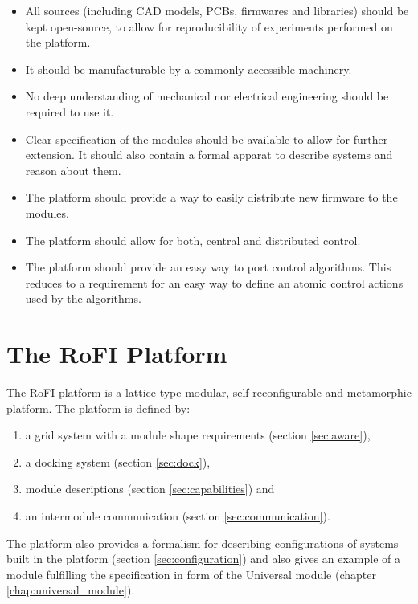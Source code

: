 \begin{itemize}
    \item All sources (including CAD models, PCBs, firmwares and libraries)
    should be kept open-source, to allow for reproducibility of experiments
    performed on the platform.
    \item It should be manufacturable by a commonly accessible machinery.
    \item No deep understanding of mechanical nor electrical engineering should
    be required to use it.
    \item Clear specification of the modules should be available to allow for
    further extension. It should also contain a formal apparat to describe
    systems and reason about them.
    \item The platform should provide a way to easily distribute new firmware to
    the modules.
    \item The platform should allow for both, central and distributed control.
    \item The platform should provide an easy way to port control algorithms.
    This reduces to a requirement for an easy way to define an atomic control
    actions used by the algorithms.
\end{itemize}

\section{The RoFI Platform}

The RoFI platform is a lattice type modular, self-reconfigurable and metamorphic
platform. The platform is defined by:
\begin{enumerate}
    \item a grid system with a module shape requirements (section \ref{sec:aware}),
    \item a docking system (section \ref{sec:dock}),
    \item module descriptions (section \ref{sec:capabilities}) and
    \item an intermodule communication (section \ref{sec:communication}).
\end{enumerate}

The platform also provides a formalism for describing configurations of systems
built in the platform (section \ref{sec:configuration}) and also gives an
example of a module fulfilling the specification in form of the Universal
module (chapter \ref{chap:universal_module}).

